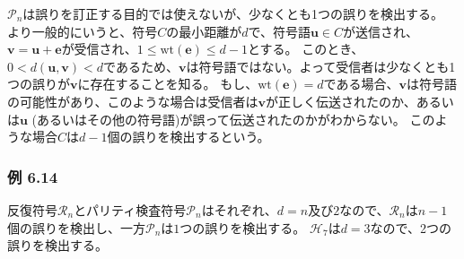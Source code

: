\documentclass[12pt,a4paper]{article}
\begin{document}
$\mathcal{P}_n$は誤りを訂正する目的では使えないが、少なくとも1つの誤りを検出する。
より一般的にいうと、符号$C$の最小距離が$d$で、符号語$\mathbf{u} \in C$が送信され、$\mathbf{v} = \mathbf{u} + \mathbf{e}$が受信され、$1 \leq \text{wt}(\mathbf{e}) \leq d - 1$とする。
このとき、$0 < d ( \mathbf{u}, \mathbf{v}) < d$であるため、$\mathbf{v}$は符号語ではない。よって受信者は少なくとも1つの誤りが$\mathbf{v}$に存在することを知る。
もし、$\text{wt}(\mathbf{e}) = d$である場合、$\mathbf{v}$は符号語の可能性があり、このような場合は受信者は$\mathbf{v}$が正しく伝送されたのか、あるいは$\mathbf{u}$ (あるいはその他の符号語)が誤って伝送されたのかがわからない。
このような場合$C$は$d-1$個の誤りを検出するという。

\subsubsection*{例 6.14}

反復符号$\mathcal{R}_n$とパリティ検査符号$\mathcal{P}_n$はそれぞれ、$d = n$及び$2$なので、$\mathcal{R}_n$は$n-1$個の誤りを検出し、一方$\mathcal{P}_n$は$1$つの誤りを検出する。
$\mathcal{H}_7$は$d=3$なので、2つの誤りを検出する。
\end{document}

